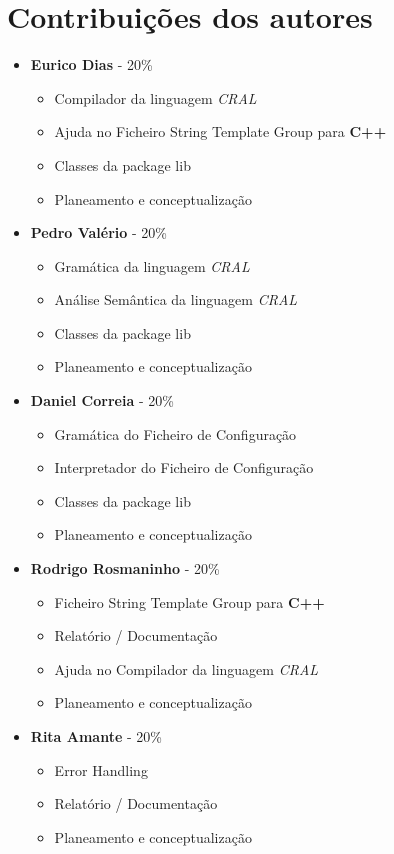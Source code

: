 \documentclass{report}
\begin{document}
\chapter{Contribuições dos autores}
\label{chap.authors}
\begin{itemize}
    \item \textbf{Eurico Dias} - 20\%
        \begin{itemize}
        \item Compilador da linguagem \textit{CRAL}
        \item Ajuda no Ficheiro String Template Group para \textbf{C++}
        \item Classes da package lib
        \item Planeamento e conceptualização
        \end{itemize}
    \item \textbf{Pedro Valério} - 20\%
        \begin{itemize}
        \item Gramática da linguagem \textit{CRAL}
        \item Análise Semântica da linguagem \textit{CRAL}
        \item Classes da package lib
        \item Planeamento e conceptualização
        \end{itemize}
    \item \textbf{Daniel Correia} - 20\%
        \begin{itemize}
        \item Gramática do Ficheiro de Configuração 
        \item Interpretador do Ficheiro de Configuração
        \item Classes da package lib
        \item Planeamento e conceptualização
        \end{itemize}
    \item \textbf{Rodrigo Rosmaninho} - 20\%
        \begin{itemize}
        \item Ficheiro String Template Group para \textbf{C++}
        \item Relatório / Documentação
        \item Ajuda no Compilador da linguagem \textit{CRAL}
        \item Planeamento e conceptualização
        \end{itemize}
    \item \textbf{Rita Amante} - 20\%
        \begin{itemize}
        \item Error Handling
        \item Relatório / Documentação 
        \item Planeamento e conceptualização
        \end{itemize}
\end{itemize}
\end{document}
